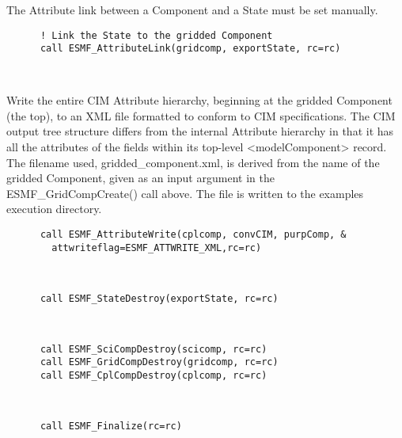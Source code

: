 
  \begin{sloppypar}
       The Attribute link between a Component and a State must be set manually.
  \end{sloppypar} 

 \begin{verbatim}
      ! Link the State to the gridded Component
      call ESMF_AttributeLink(gridcomp, exportState, rc=rc)

 
\end{verbatim}
 

  \begin{sloppypar}
       Write the entire CIM Attribute hierarchy, beginning at the gridded
       Component (the top), to an XML file formatted to conform to CIM
       specifications.  The CIM output tree structure differs from the
       internal Attribute hierarchy in that it has all the attributes of
       the fields within its top-level <modelComponent> record.  The filename
       used, gridded\_component.xml, is derived from the name of the gridded
       Component, given as an input argument in the ESMF\_GridCompCreate()
       call above.  The file is written to the examples execution directory.
  \end{sloppypar} 

 \begin{verbatim}
      call ESMF_AttributeWrite(cplcomp, convCIM, purpComp, &
        attwriteflag=ESMF_ATTWRITE_XML,rc=rc)
 
\end{verbatim}
 
 

 \begin{verbatim}

      call ESMF_StateDestroy(exportState, rc=rc)
 
\end{verbatim}
 

 \begin{verbatim}

      call ESMF_SciCompDestroy(scicomp, rc=rc)
      call ESMF_GridCompDestroy(gridcomp, rc=rc)
      call ESMF_CplCompDestroy(cplcomp, rc=rc)
 
\end{verbatim}
 

 \begin{verbatim}

      call ESMF_Finalize(rc=rc)
 
\end{verbatim}

\setlength{\parskip}{\oldparskip}
\setlength{\parindent}{\oldparindent}
\setlength{\baselineskip}{\oldbaselineskip}
